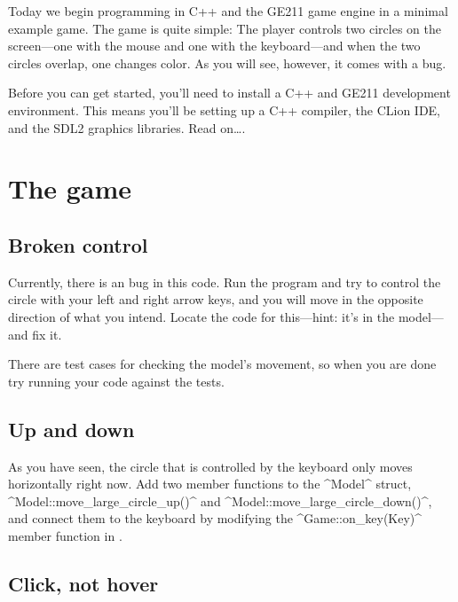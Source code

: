 \documentclass{tufte-handout}
\begin{document}
\maketitle

Today we begin programming in C++ and the GE211 game engine in a minimal
example game. The game is quite simple: The player controls two circles
on the screen---one with the mouse and one with the keyboard---and when
the two circles overlap, one changes color. As you will see, however, it
comes with a bug.

Before you can get started, you’ll need to install a C++ and GE211
development environment. This means you’ll be setting up a C++ compiler,
the CLion IDE, and the SDL2 graphics libraries. Read on\ldots.

\CxxPrelims*

\section{The game}

\subsection{Broken control}

Currently, there is an bug in this code. Run the program and try to
control the circle with your left and right arrow keys, and you will
move in the opposite direction of what you intend. Locate the code for
this---hint: it's in the model---and fix it.

There are test cases for checking the model's movement, so when you are
done try running your code against the tests.

\subsection{Up and down}

As you have seen, the circle that is controlled by the keyboard only
moves horizontally right now. Add two member functions to the
^Model^ struct, ^Model::move_large_circle_up()^ and
^Model::move_large_circle_down()^, and connect them to the
keyboard by modifying the ^Game::on_key(Key)^ member function in
.

\subsection{Click, not hover}
\end{document}
